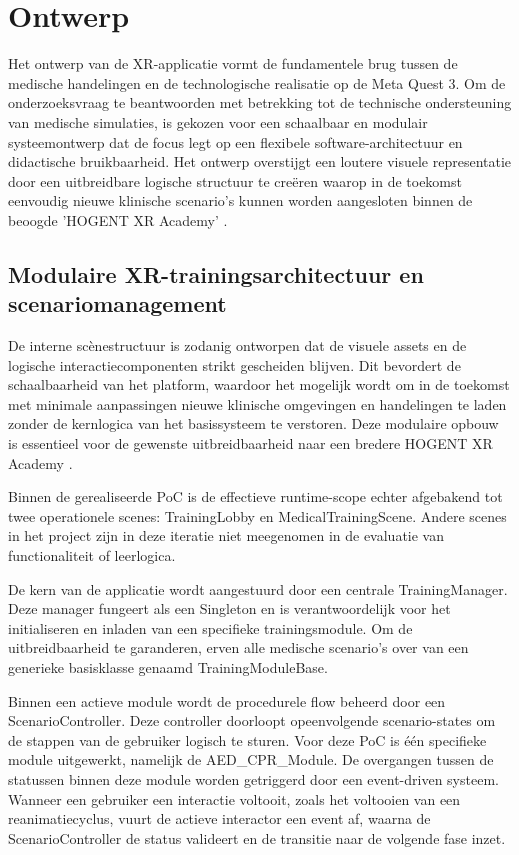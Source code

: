 \chapter{Ontwerp}%
\label{ch:ontwerp}

Het ontwerp van de XR-applicatie vormt de fundamentele brug tussen de medische handelingen en de technologische realisatie op de Meta Quest 3. Om de onderzoeksvraag te beantwoorden met betrekking tot de technische ondersteuning van medische simulaties, is gekozen voor een schaalbaar en modulair systeemontwerp dat de focus legt op een flexibele software-architectuur en didactische bruikbaarheid. Het ontwerp overstijgt een loutere visuele representatie door een uitbreidbare logische structuur te creëren waarop in de toekomst eenvoudig nieuwe klinische scenario's kunnen worden aangesloten binnen de beoogde 'HOGENT XR Academy' \cite{Radianti2020VRHE}.

\section{Modulaire XR-trainingsarchitectuur en scenariomanagement}

De interne scènestructuur is zodanig ontworpen dat de visuele assets en de logische interactiecomponenten strikt gescheiden blijven. Dit bevordert de schaalbaarheid van het platform, waardoor het mogelijk wordt om in de toekomst met minimale aanpassingen nieuwe klinische omgevingen en handelingen te laden zonder de kernlogica van het basissysteem te verstoren. Deze modulaire opbouw is essentieel voor de gewenste uitbreidbaarheid naar een bredere HOGENT XR Academy \cite{Radianti2020VRHE}.

Binnen de gerealiseerde PoC is de effectieve runtime-scope echter afgebakend tot twee operationele scenes: TrainingLobby en MedicalTrainingScene. Andere scenes in het project zijn in deze iteratie niet meegenomen in de evaluatie van functionaliteit of leerlogica.

De kern van de applicatie wordt aangestuurd door een centrale TrainingManager. Deze manager fungeert als een Singleton en is verantwoordelijk voor het initialiseren en inladen van een specifieke trainingsmodule. Om de uitbreidbaarheid te garanderen, erven alle medische scenario's over van een generieke basisklasse genaamd TrainingModuleBase. 

Binnen een actieve module wordt de procedurele flow beheerd door een ScenarioController. Deze controller doorloopt opeenvolgende scenario-states om de stappen van de gebruiker logisch te sturen. Voor deze PoC is één specifieke module uitgewerkt, namelijk de AED\_CPR\_Module. De overgangen tussen de statussen binnen deze module worden getriggerd door een event-driven systeem. Wanneer een gebruiker een interactie voltooit, zoals het voltooien van een reanimatiecyclus, vuurt de actieve interactor een event af, waarna de ScenarioController de status valideert en de transitie naar de volgende fase inzet.


